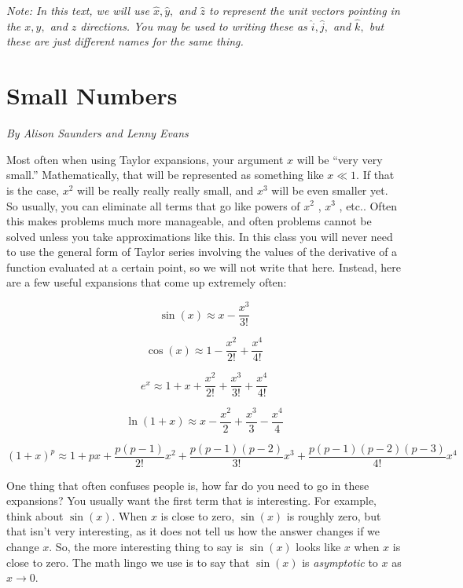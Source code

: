 \documentclass[12pt]{book}
\begin{document}
 {\it Note: In this text, we will use $\hat{x}, \hat{y},$ and $\hat{z}$ to represent the unit vectors pointing in the $x,y,$ and $z$ directions. You may be used to writing these as $\hat{i},\hat{j},$ and $\hat{k},$ but these are just different names for the same thing.}

 \pagebreak
 
\section{Small Numbers}

{\it By Alison Saunders and Lenny Evans}

\noindent Most often when using Taylor expansions, your argument $x$ will be “very very small.” Mathematically, that will be represented as something like $x \ll 1$. If that is the case, $x^2$ will be really really really small, and $x^3$ will be even smaller yet. So usually, you can eliminate all terms that go like powers of $x^2$ , $x^3$ , etc.. Often this makes problems much more manageable, and often problems cannot be solved unless you take approximations like this. In this class you will never need to use the general form of Taylor series involving the values of the derivative of a function evaluated at a certain point, so we will not write that here. Instead, here are a few useful expansions that come up extremely often:

\begin{equation*}
 \sin(x) \approx x - \frac{x^3}{3!}
\end{equation*}

\begin{equation*}
 \cos(x) \approx 1-\frac{x^2}{2!}+\frac{x^4}{4!}
 \end{equation*}
 
 \begin{equation*}
  e^x \approx 1+x+\frac{x^2}{2!}+\frac{x^3}{3!}+\frac{x^4}{4!}
 \end{equation*}

 \begin{equation*}
  \ln(1+x) \approx x-\frac{x^2}{2}+\frac{x^3}{3}-\frac{x^4}{4}
 \end{equation*}

 \begin{equation*}
  (1+x)^p \approx 1+px+\frac{p(p-1)}{2!}x^2+\frac{p(p-1)(p-2)}{3!}x^3+\frac{p(p-1)(p-2)(p-3)}{4!}x^4
 \end{equation*}
 
 One thing that often confuses people is, how far do you need to go in these expansions? You usually want the first term that is interesting. For example, think about $\sin(x).$ When $x$ is close to zero, $\sin(x)$ is roughly zero, but that isn't very interesting, as it does not tell us how the answer changes if we change $x.$ So, the more interesting thing to say is $\sin(x)$ looks like $x$ when $x$ is close to zero. The math lingo we use is to say that $\sin(x)$ is {\it asymptotic} to $x$ as $x\to 0.$
 
\end{document}
